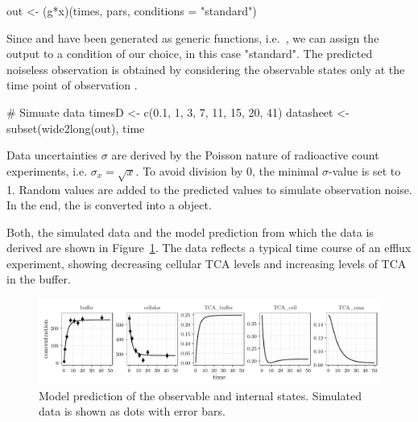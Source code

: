 \documentclass[article]{jss}
\begin{document}
\begin{CodeChunk}
\begin{CodeInput}
out <- (g*x)(times, pars, conditions = "standard")
\end{CodeInput}
\end{CodeChunk}
Since  and  have been generated as generic functions, i.e.~, we can assign the output to a condition of our choice, in this case "standard".
The predicted noiseless observation is obtained by considering the observable states only at the time point of observation .
\begin{CodeChunk}
\begin{CodeInput}
# Simuate data
timesD <- c(0.1, 1, 3, 7, 11, 15, 20, 41)
datasheet <- subset(wide2long(out),
                    time %
\end{CodeInput}
\end{CodeChunk}

Data uncertainties $\sigma$ are derived by the Poisson nature of radioactive count experiments, i.e. $\sigma_x = \sqrt{x}$. To avoid division by 0, the minimal $\sigma$-value is set to 1. Random values are added to the predicted values to simulate observation noise. In the end, the  is converted into a  object.


\begin{CodeChunk}
\end{CodeChunk}
Both, the simulated data and the model prediction from which the data is derived are shown in Figure~\ref{fig:observation}. The data reflects a typical time course of an efflux experiment, showing decreasing cellular TCA levels and increasing levels of TCA in the buffer.
\begin{figure}[ht]
	\centering
	\includegraphics[width = \textwidth]{images/figure2}
	\caption{Model prediction of the observable and internal states. Simulated data is shown as dots with error bars.}
	\label{fig:observation}
\end{figure}
\end{document}
